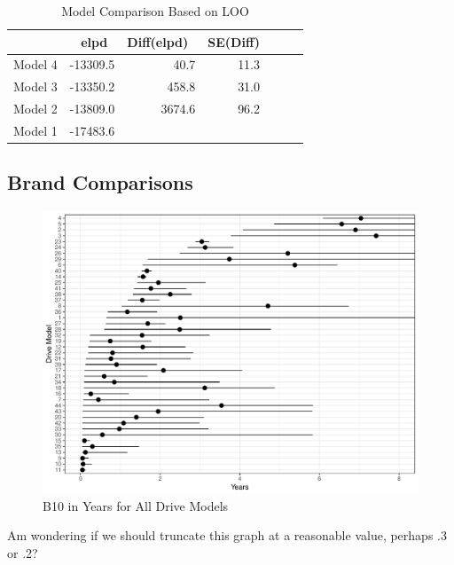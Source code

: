 \documentclass[12pt]{article}
\begin{document}
\begin{table}[H]
\centering
\begin{tabular}{rrrrrrr}
  \hline
 & elpd\ & Diff(elpd)\ & SE(Diff) \\ 
  \hline
Model 4 & -13309.5 & 40.7 & 11.3 \\ 
Model 3 & -13350.2 & 458.8 & 31.0  \\ 
Model 2 & -13809.0 & 3674.6 & 96.2 \\ 
Model 1 & -17483.6  \\ 
   \hline
\end{tabular}
\caption{Model Comparison Based on LOO}
\label{table:1}
\end{table}


\subsection{Brand Comparisons}



\begin{figure}[H]
    \centering
   \includegraphics[width=5.0in]{fig/B10_full.pdf}
		\caption{B10 in Years for All Drive Models \label{fig:first}} 
\end{figure}

Am wondering if we should truncate this graph at a reasonable value, perhaps .3 or .2?  
\end{document}
